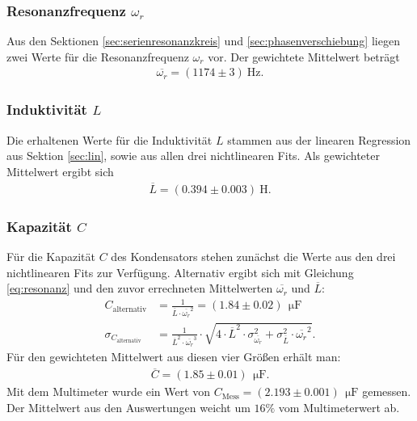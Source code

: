 \documentclass[12pt,a4paper,titlepage,headinclude]{scrartcl}
\numberwithin{equation}{subsection}
\newcommand{\mrm}[1]{\mathrm{#1}}
\begin{document}
\subsubsection{Resonanzfrequenz $\omega_r$}
Aus den Sektionen \ref{sec:serienresonanzkreis} und \ref{sec:phasenverschiebung} liegen zwei Werte für die Resonanzfrequenz $\omega_r$ vor. Der gewichtete Mittelwert beträgt
\begin{align}
	\overline{\omega_r}=(1174\pm3)~\mrm{Hz}.
	\label{omegarmittel}
\end{align}
\subsubsection{Induktivität $L$}
Die erhaltenen Werte für die Induktivität $L$ stammen aus der linearen Regression aus Sektion \ref{sec:lin}, sowie aus allen drei nichtlinearen Fits. Als gewichteter Mittelwert ergibt sich
\begin{align}
	\overline{L}=(0.394\pm0.003)~\mrm{H}.
	\label{eq:Induktmittel}
\end{align}
\subsubsection{Kapazität $C$}
Für die Kapazität $C$ des Kondensators stehen zunächst die Werte aus den drei nichtlinearen Fits zur Verfügung. Alternativ ergibt sich mit Gleichung \eqref{eq:resonanz} und den zuvor errechneten Mittelwerten $\overline{\omega_r}$ und $\overline{L}$:
\begin{align}
	C_{\text{alternativ}}&=\frac{1}{\overline{L} \cdot \overline{\omega_r}^{2}}=(1.84\pm0.02)~\SI{}{\micro\farad}\\
	\sigma_{C_{\text{alternativ}}}&=\frac{1}{\overline{L}^{2} \cdot \overline{\omega_r}^{3}} \cdot \sqrt{4 \cdot \overline{L}^{2} \cdot \sigma_{\overline{\omega_r}}^{2} + \sigma_{\overline{L}}^{2} \cdot \overline{\omega_r}^{2}}.
	\label{eq:alternativ}
\end{align}
Für den gewichteten Mittelwert aus diesen vier Größen erhält man:
\begin{align}
	\overline{C}=(1.85\pm0.01)~\SI{}{\micro\farad}.
	\label{eq:cmittelfit}
\end{align}
Mit dem Multimeter wurde ein Wert von $C_{\mrm{Mess}}=(2.193\pm0.001)~\SI{}{\micro\farad}$ gemessen. Der Mittelwert aus den Auswertungen weicht um $16\%$ vom Multimeterwert ab. 
\end{document}
